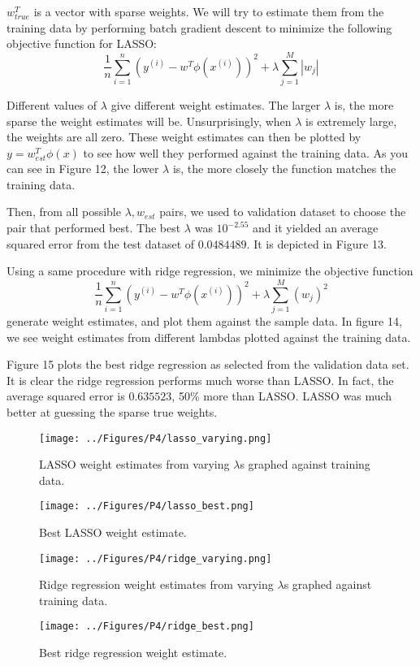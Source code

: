 \documentclass[a4paper,twoside]{article}
\begin{document}
$w_{true}^T$ is a vector with sparse weights. We will try to estimate them from the training data by performing batch gradient descent to minimize the following objective function for LASSO:
\begin{equation}
\frac{1}{n} \sum_{i=1}^{n} (y^{(i)} - w^T \phi(x^{(i)}))^2 + \lambda \sum_{j=1}^{M} |w_j|
\end{equation}

Different values of $\lambda$ give different weight estimates. The larger $\lambda$ is, the more sparse the weight estimates will be. Unsurprisingly, when $\lambda$ is extremely large, the weights are all zero. These weight estimates can then be plotted by $y = w_{est}^T \phi (x)$ to see how well they performed against the training data. As you can see in Figure 12, the lower $\lambda$ is, the more closely the function matches the training data.

Then, from all possible $\lambda, w_{est}$ pairs, we used to validation dataset to choose the pair that performed best. The best $\lambda$ was $10^{-2.55}$ and it yielded an average squared error from the test dataset of $0.0484489$. It is depicted in Figure 13.

Using a same procedure with ridge regression, we minimize the objective function
\begin{equation}
\frac{1}{n} \sum_{i=1}^{n} (y^{(i)} - w^T \phi(x^{(i)}))^2 + \lambda \sum_{j=1}^{M} (w_j)^2
\end{equation}
generate weight estimates, and plot them against the sample data. In figure 14, we see weight estimates from different lambdas plotted against the training data.

Figure 15 plots the best ridge regression as selected from the validation data set. It is clear the ridge regression performs much worse than LASSO. In fact, the average squared error is $0.635523$, 50\% more than LASSO. LASSO was much better at guessing the sparse true weights.

\begin{figure}[h]
  \texttt{[image: ../Figures/P4/lasso\_varying.png]}
  \caption{LASSO weight estimates from varying $\lambda$s graphed against training data.}
  \label{fig:lasso_varying}
\end{figure}

\begin{figure}[h]
  \texttt{[image: ../Figures/P4/lasso\_best.png]}
  \caption{Best LASSO weight estimate.}
  \label{fig:lasso_best}
\end{figure}

\begin{figure}[h]
  \texttt{[image: ../Figures/P4/ridge\_varying.png]}
  \caption{Ridge regression weight estimates from varying $\lambda$s graphed against training data.}
  \label{fig:ridge_varying}
\end{figure}

\begin{figure}[h]
  \texttt{[image: ../Figures/P4/ridge\_best.png]}
  \caption{Best ridge regression weight estimate.}
  \label{fig:ridge_best}
\end{figure}




\vfill
\end{document}
